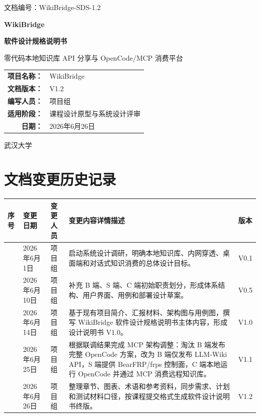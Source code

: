 \documentclass[UTF8,a4paper,12pt,fontset=fandol]{ctexart}
\newcommand{\docid}{WikiBridge-SDS-1.2}
\newcommand{\docdate}{2026年6月26日}
\begin{document}
\begin{titlepage}
  \thispagestyle{empty}
  \begin{flushleft}
    \small 文档编号：\docid
  \end{flushleft}
  \vspace*{2.2cm}
  \begin{center}
    {\bfseries WikiBridge\par}
    \vspace{0.5cm}
    {\bfseries 软件设计规格说明书\par}
    \vspace{0.8cm}
    {\large 零代码本地知识库 API 分享与 OpenCode/MCP 消费平台\par}
    \vspace{2.4cm}
    \begin{tabular}{>{\bfseries}r l}
      项目名称： & WikiBridge \\
      文档版本： & V1.2 \\
      编写人员： & 项目组 \\
      适用阶段： & 课程设计原型与系统设计评审 \\
      日期： & \docdate \\
    \end{tabular}
  \end{center}
  \vfill
  \begin{center}
    武汉大学
  \end{center}
\end{titlepage}

\section*{文档变更历史记录}
\begin{longtable}{>{\centering\arraybackslash}p{1.2cm}>{\centering\arraybackslash}p{2.8cm}>{\centering\arraybackslash}p{2.2cm}p{6.4cm}>{\centering\arraybackslash}p{1.8cm}}
\toprule
序号 & 变更日期 & 变更人员 & 变更内容详情描述 & 版本 \\
\midrule
1 & 2026年6月1日 & 项目组 & 启动系统设计调研，明确本地知识库、内网穿透、桌面端和对话式知识消费的总体设计目标。 & V0.1 \\
2 & 2026年6月10日 & 项目组 & 补充 B 端、S 端、C 端初始职责划分，形成体系结构、用户界面、用例和部署设计草案。 & V0.5 \\
3 & 2026年6月14日 & 项目组 & 基于现有项目简介、汇报材料、架构图与用例图，撰写 WikiBridge 软件设计规格说明书主体内容，形成设计说明书 V1.0。 & V1.0 \\
4 & 2026年6月25日 & 项目组 & 根据联调结果完成 MCP 架构调整：淘汰 B 端发布完整 OpenCode 方案，改为 B 端仅发布 LLM-Wiki API，S 端提供 BearFRP/frps 控制面，C 端本地运行 OpenCode 并通过 MCP 消费远程知识库。 & V1.1 \\
5 & 2026年6月26日 & 项目组 & 整理章节、图表、术语和参考资料，同步需求、计划和测试材料口径，按课程提交格式生成软件设计说明书终版。 & V1.2 \\
\bottomrule
\end{longtable}
\end{document}
